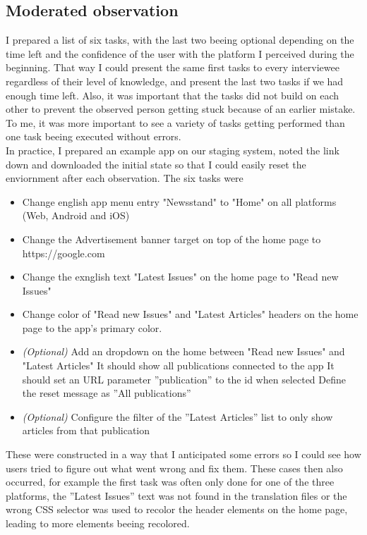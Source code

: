 \subsection{Moderated observation}
I prepared a list of six tasks, with the last two beeing optional depending on the time left and the confidence of the user with the platform I perceived during the beginning.
That way I could present the same first tasks to every interviewee regardless of their level of knowledge, and present the last two tasks if we had enough time left.
Also, it was important that the tasks did not build on each other to prevent the observed person getting stuck because of an earlier mistake.
To me, it was more important to see a variety of tasks getting performed than one task beeing executed without errors. 
\\
In practice, I prepared an example app on our staging system, noted the link down and downloaded the initial state so that I could easily reset the enviornment after each observation.
The six tasks were
\begin{itemize}
  \item Change english app menu entry "Newsstand" to "Home" on all platforms (Web, Android and iOS)
  \item Change the Advertisement banner target on top of the home page to https://google.com 
  \item Change the exnglish text "Latest Issues" on the home page to "Read new Issues"
  \item Change color of "Read new Issues" and "Latest Articles" headers on the home page to the app's primary color.
  \item \textit{(Optional)} Add an dropdown on the home between "Read new Issues" and "Latest Articles"
    \subitem It should show all publications connected to the app
    \subitem It should set an URL parameter ''publication'' to the id when selected
    \subitem Define the reset message as ''All publications''
  \item \textit{(Optional)} Configure the filter of the ''Latest Articles'' list to only show articles from that publication
\end{itemize}

These were constructed in a way that I anticipated some errors so I could see how users tried to figure out what went wrong and fix them.
These cases then also occurred, for example the first task was often only done for one of the three platforms, the ''Latest Issues'' text was not found in the translation files or
the wrong CSS selector was used to recolor the header elements on the home page, leading to more elements beeing recolored.

